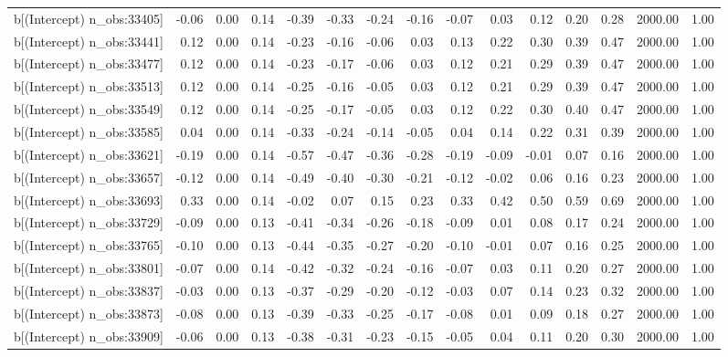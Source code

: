\begin{table}[ht]
\begin{tabular}{rrrrrrrrrrrrrrr}
  b[(Intercept) n\_obs:33405] & -0.06 & 0.00 & 0.14 & -0.39 & -0.33 & -0.24 & -0.16 & -0.07 & 0.03 & 0.12 & 0.20 & 0.28 & 2000.00 & 1.00 \\ 
  b[(Intercept) n\_obs:33441] & 0.12 & 0.00 & 0.14 & -0.23 & -0.16 & -0.06 & 0.03 & 0.13 & 0.22 & 0.30 & 0.39 & 0.47 & 2000.00 & 1.00 \\ 
  b[(Intercept) n\_obs:33477] & 0.12 & 0.00 & 0.14 & -0.23 & -0.17 & -0.06 & 0.03 & 0.12 & 0.21 & 0.29 & 0.39 & 0.47 & 2000.00 & 1.00 \\ 
  b[(Intercept) n\_obs:33513] & 0.12 & 0.00 & 0.14 & -0.25 & -0.16 & -0.05 & 0.03 & 0.12 & 0.21 & 0.29 & 0.39 & 0.47 & 2000.00 & 1.00 \\ 
  b[(Intercept) n\_obs:33549] & 0.12 & 0.00 & 0.14 & -0.25 & -0.17 & -0.05 & 0.03 & 0.12 & 0.22 & 0.30 & 0.40 & 0.47 & 2000.00 & 1.00 \\ 
  b[(Intercept) n\_obs:33585] & 0.04 & 0.00 & 0.14 & -0.33 & -0.24 & -0.14 & -0.05 & 0.04 & 0.14 & 0.22 & 0.31 & 0.39 & 2000.00 & 1.00 \\ 
  b[(Intercept) n\_obs:33621] & -0.19 & 0.00 & 0.14 & -0.57 & -0.47 & -0.36 & -0.28 & -0.19 & -0.09 & -0.01 & 0.07 & 0.16 & 2000.00 & 1.00 \\ 
  b[(Intercept) n\_obs:33657] & -0.12 & 0.00 & 0.14 & -0.49 & -0.40 & -0.30 & -0.21 & -0.12 & -0.02 & 0.06 & 0.16 & 0.23 & 2000.00 & 1.00 \\ 
  b[(Intercept) n\_obs:33693] & 0.33 & 0.00 & 0.14 & -0.02 & 0.07 & 0.15 & 0.23 & 0.33 & 0.42 & 0.50 & 0.59 & 0.69 & 2000.00 & 1.00 \\ 
  b[(Intercept) n\_obs:33729] & -0.09 & 0.00 & 0.13 & -0.41 & -0.34 & -0.26 & -0.18 & -0.09 & 0.01 & 0.08 & 0.17 & 0.24 & 2000.00 & 1.00 \\ 
  b[(Intercept) n\_obs:33765] & -0.10 & 0.00 & 0.13 & -0.44 & -0.35 & -0.27 & -0.20 & -0.10 & -0.01 & 0.07 & 0.16 & 0.25 & 2000.00 & 1.00 \\ 
  b[(Intercept) n\_obs:33801] & -0.07 & 0.00 & 0.14 & -0.42 & -0.32 & -0.24 & -0.16 & -0.07 & 0.03 & 0.11 & 0.20 & 0.27 & 2000.00 & 1.00 \\ 
  b[(Intercept) n\_obs:33837] & -0.03 & 0.00 & 0.13 & -0.37 & -0.29 & -0.20 & -0.12 & -0.03 & 0.07 & 0.14 & 0.23 & 0.32 & 2000.00 & 1.00 \\ 
  b[(Intercept) n\_obs:33873] & -0.08 & 0.00 & 0.13 & -0.39 & -0.33 & -0.25 & -0.17 & -0.08 & 0.01 & 0.09 & 0.18 & 0.27 & 2000.00 & 1.00 \\ 
  b[(Intercept) n\_obs:33909] & -0.06 & 0.00 & 0.13 & -0.38 & -0.31 & -0.23 & -0.15 & -0.05 & 0.04 & 0.11 & 0.20 & 0.30 & 2000.00 & 1.00 \\ 

\end{tabular}
\end{table}

